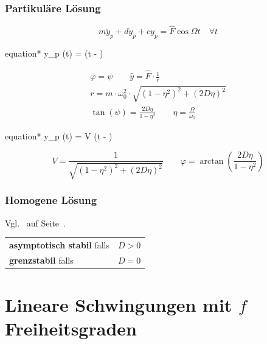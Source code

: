 \documentclass[9pt,fleqn,ngerman,article]{memoir}
\begin{document}
\begin{multicols*}{3}
				\subsubsection{Partikuläre Lösung} %
					
					\[
						m \ddot{y}_p + d \dot{y}_p + c y_p = \hat{F} \cos \Omega t \quad \forall t
					\]
					
					\begin{empheq}[box=\shadowbox*]{equation*}
						y_p (t) =  \cos (\Omega t - \varphi)
					\end{empheq}
					
					\begin{gather*}
						\varphi = \psi \qquad \hat{y} = \hat{F} \cdot \frac{1}{r} \\
						r = m \cdot \omega_0^2 \cdot \sqrt{(1-\eta^2)^2 + (2D \eta)^2} \\
						\tan(\psi) = \frac{2D\eta}{1-\eta^2} \qquad \eta = \frac{\Omega}{\omega_0}
					\end{gather*}
					
					\begin{empheq}[box=\shadowbox*]{equation*}
						y_p (t) =  V \cos (\Omega t - \varphi)
					\end{empheq}
					
					\[
						V = \frac{1}{\sqrt{(1- \eta^2)^2 + (2D \eta)^2}} \qquad \varphi = \arctan \left(\frac{2D\eta}{1-\eta^2}\right)
					\]
				
				\subsubsection{Homogene Lösung} %
				
					Vgl.~ auf Seite~\pageref{subsec:daempfung}.
					
					\begin{tabular}{ll@{}}
						\textbf{asymptotisch stabil} falls & $D > 0$ \\
						\textbf{grenzstabil} falls & $D = 0$
					\end{tabular}
				
		\section{Lineare Schwingungen mit $f$ Freiheitsgraden} %

\end{multicols*}
\end{document}
